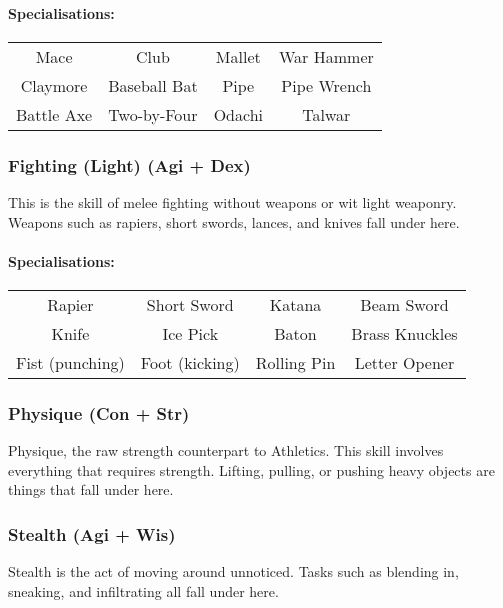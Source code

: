 \paragraph{Specialisations:}
\begin{center}
    \begin{tabular}{c|c|c|c}
        Mace & Club & Mallet & War Hammer \\
        Claymore & Baseball Bat & Pipe & Pipe Wrench \\
        Battle Axe & Two-by-Four & Odachi & Talwar \\
    \end{tabular}
\end{center}

\subsubsection{Fighting (Light) (Agi + Dex)}
This is the skill of melee fighting without weapons or wit light weaponry. 
Weapons such as rapiers, short swords, lances, and knives fall under here.

\paragraph{Specialisations:}
\begin{center}
    \begin{tabular}{c|c|c|c}
        Rapier & Short Sword & Katana & Beam Sword \\
        Knife & Ice Pick & Baton & Brass Knuckles \\
        Fist (punching) & Foot (kicking) & Rolling Pin & Letter Opener \\
    \end{tabular}
\end{center}

\subsubsection{Physique (Con + Str)}
Physique, the raw strength counterpart to Athletics. 
This skill involves everything that requires strength.
Lifting, pulling, or pushing heavy objects are things that fall under here.

\subsubsection{Stealth (Agi + Wis)}
Stealth is the act of moving around unnoticed.
Tasks such as blending in, sneaking, and infiltrating all fall under here.

